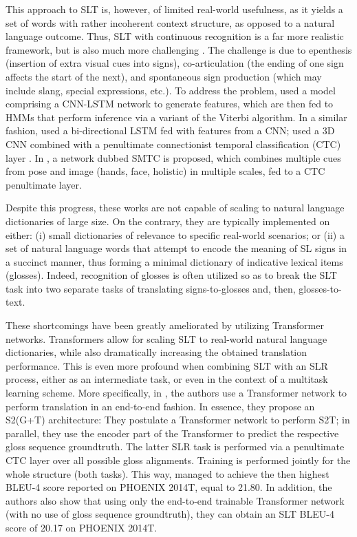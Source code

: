 \documentclass[10pt,twocolumn,letterpaper]{article}
\begin{document}
This approach to SLT is, however, of limited real-world usefulness, as it yields a set of words with rather incoherent context structure, as opposed to a natural language outcome. Thus, SLT with continuous recognition is a far more realistic framework, but is also much more challenging \cite{Koller2015, Koller2017, Aloysius2020}. The challenge is due to epenthesis (insertion of extra visual cues into signs), co-articulation (the ending of one sign affects the start of the next), and spontaneous sign production (which may include slang, special expressions, etc.). To address the problem, \cite{Koller2020} used a model comprising a CNN-LSTM network to generate features, which are then fed to HMMs that perform inference via a variant of the Viterbi algorithm. In a similar fashion, \cite{Cui2017} used a bi-directional LSTM fed with features from a CNN; \cite{Molchanov2016} used a 3D CNN combined with a penultimate connectionist temporal classification (CTC) layer \cite{Graves2006}. In \cite{ZhouZZL20}, a network dubbed SMTC is proposed, which combines multiple cues from pose and image (hands, face, holistic) in multiple scales, fed to a CTC penultimate layer.

Despite this progress, these works are not capable of scaling to natural language dictionaries of large size. On the contrary, they are typically implemented on either: (i) small dictionaries of relevance to specific real-world scenarios; or (ii) a set of natural language words that attempt to encode the meaning of SL signs in a succinct manner, thus forming a minimal dictionary of indicative lexical items (glosses). Indeed, recognition of glosses is often utilized so as to break the SLT task into two separate tasks of translating signs-to-glosses and, then, glosses-to-text. 


These shortcomings have been greatly ameliorated by utilizing Transformer networks. Transformers allow for scaling SLT to real-world natural language dictionaries, while also dramatically increasing the obtained translation performance. This is even more profound when combining SLT with an SLR process, either as an intermediate task, or even in the context of a multitask learning scheme. More specifically, in \cite{Camgoz20}, the authors use a Transformer network to perform translation in an end-to-end fashion. In essence, they propose an S2(G+T) architecture: They postulate a Transformer network to perform S2T; in parallel, they use the encoder part of the Transformer to predict the respective gloss sequence groundtruth. The latter SLR task is performed via a penultimate CTC layer over all possible gloss alignments. Training is performed jointly for the whole structure (both tasks). This way, \cite{Camgoz20} managed to achieve the then highest BLEU-4 score reported on PHOENIX 2014T, equal to 21.80. In addition, the authors also show that using only the end-to-end trainable Transformer network (with no use of gloss sequence groundtruth), they can obtain an SLT BLEU-4 score of 20.17 on PHOENIX 2014T. 
\end{document}
